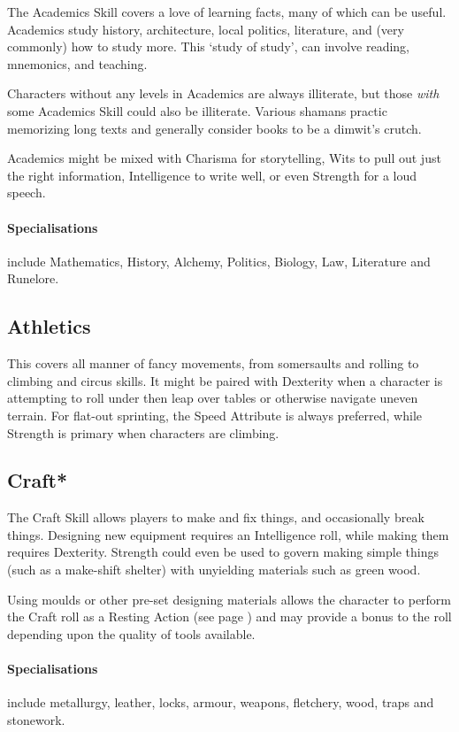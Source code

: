 \documentclass[titlepage,a4paper,openany]{book}
\begin{document}
\begin{multicols}{2}
The Academics Skill covers a love of learning facts, many of which can be useful.
Academics study history, architecture, local politics, literature, and (very commonly) how to study more.
This `study of study', can involve reading, mnemonics, and teaching.

Characters without any levels in Academics are always illiterate, but those \emph{with} some Academics Skill could also be illiterate.
Various shamans practic memorizing long texts and generally consider books to be a dimwit's crutch.

Academics might be mixed with Charisma for storytelling, Wits to pull out just the right information, Intelligence to write well, or even Strength for a loud speech.

\paragraph{Specialisations} include Mathematics, History, Alchemy, Politics, Biology, Law, Literature and Runelore.

\subsection{Athletics}

This covers all manner of fancy movements, from somersaults and rolling to climbing and circus skills. It might be paired with Dexterity when a character is attempting to roll under then leap over tables or otherwise navigate uneven terrain. For flat-out sprinting, the Speed Attribute is always preferred, while Strength is primary when characters are climbing.

\subsection{Craft*}

The Craft Skill allows players to make and fix things, and occasionally break things.
Designing new equipment requires an Intelligence roll, while making them requires Dexterity.
Strength could even be used to govern making simple things (such as a make-shift shelter) with unyielding materials such as green wood.

Using moulds or other pre-set designing materials allows the character to perform the Craft roll as a Resting Action (see page \pageref{restingactions}) and may provide a bonus to the roll depending upon the quality of tools available.

\paragraph{Specialisations} include metallurgy, leather, locks, armour, weapons, fletchery, wood, traps and stonework.


\end{multicols}
\end{document}
